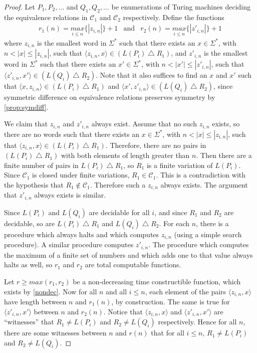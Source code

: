 \documentclass{article}
\theoremstyle{definition} \newtheorem{definition}[definition]{Definition}
\newcommand{\symdiff}{\bigtriangleup} %
\newcommand{\pair}[2]{\langle#1,#2\rangle} %
\begin{document}
\begin{proof}
  Let $P_1, P_2, \ldots$ and $Q_1, Q_2, \ldots$ be enumerations of Turing
  machines deciding the equivalence relations in $\mathcal{C}_1$ and
  $\mathcal{C}_2$ respectively. Define the functions
  \begin{eqnarray*}
    r_1(n)=\underset{i\leq n}{max}\{|z_{i,n}|\}+1 & \text{and} &
    r_2(n)=\underset{i\leq n}{max}\{|z'_{i,n}|\}+1
  \end{eqnarray*}
  where $z_{i,n}$ is the smallest word in $\Sigma^*$ such that there exists an
  $x\in\Sigma^*$, with $n<|x|\leq|z_{i,n}|$, such that
  $\pair{z_{i,n}}{x}\in(L(P_i)\symdiff R_1)$, and $z'_{i,n}$ is the smallest
  word in $\Sigma^*$ such that there exists an $x'\in\Sigma^*$, with
  $n<|x'|\leq|z'_{i,n}|$, such that $\pair{z'_{i,n}}{x'}\in(L(Q_i)\symdiff
  R_2)$. Note that it also suffices to find an $x$ and $x'$ such that
  $\pair{x}{z_{i,n}}\in(L(P_i)\symdiff R_1)$ and
  $\pair{x'}{z'_{i,n}}\in(L(Q_i)\symdiff R_2)$, since symmetric difference on
  equivalence relations preserves symmetry by \autoref{prop:symdiff}.

  We claim that $z_{i,n}$ and $z'_{i,n}$ always exist. Assume that no such
  $z_{i,n}$ exists, so there are no words such that there exists an
  $x\in\Sigma^*$, with $n<|x|\leq|z_{i,n}|$, such that
  $\pair{z_{i,n}}{x}\in(L(P_i)\symdiff R_1)$. Therefore, there are no pairs in
  $(L(P_i)\symdiff R_1)$ with both elements of length greater than $n$. Then
  there are a finite number of pairs in $L(P_i)\symdiff R_1$, so $R_1$ is a
  finite variation of $L(P_i)$. Since $\mathcal{C}_1$ is closed under finite
  variations, $R_1\in\mathcal{C}_1$. This is a contradiction with the
  hypothesis that $R_1\notin\mathcal{C}_1$. Therefore such a $z_{i,n}$ always
  exists. The argument that $z'_{i,n}$ always exists is similar.

  Since $L(P_i)$ and $L(Q_i)$ are decidable for all $i$, and since $R_1$ and
  $R_2$ are decidable, so are $L(P_i)\symdiff R_1$ and $L(Q_i)\symdiff
  R_2$. For each $n$, there is a procedure which always halts and which
  computes $z_{i,n}$ (using a simple search procedure). A similar procedure
  computes $z'_{i,n}$. The procedure which computes the maximum of a finite set
  of numbers and which adds one to that value always halts as well, so $r_1$
  and $r_2$ are total computable functions.

  Let $r\ge max(r_1,r_2)$ be a non-decreasing time constructible function,
  which exists by \autoref{nondec}. Now for all $n$ and all $i\leq n$, each
  element of the pairs $\pair{z_{i,n}}{x}$ have length between $n$ and
  $r_1(n)$, by construction. The same is true for $\pair{z'_{i,n}}{x'}$ between
  $n$ and $r_2(n)$. Notice that $\pair{z_{i,n}}{x}$ and $\pair{z'_{i,n}}{x'}$
  are ``witnesses'' that $R_1\neq L(P_i)$ and $R_2\neq L(Q_i)$
  respectively. Hence for all $n$, there are some witnesses between $n$ and
  $r(n)$ that for all $i\leq n$, $R_1\neq L(P_i)$ and $R_2\neq L(Q_i)$.


\end{proof}
\end{document}
